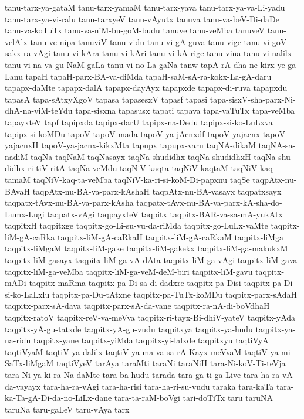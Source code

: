{tanu-tarx-ya-gataM
tanu-tarx-yamaM
tanu-tarx-yava
tanu-tarx-ya-va-Li-yadu
tanu-tarx-ya-vi-ralu
tanu-tarxyeV
tanu-vAyutx
tanuva
tanu-va-beV-Di-daDe
tanu-va-koTuTx
tanu-va-niM-bu-goM-budu
tanuve
tanu-veMba
tanuveV
tanu-velAlx
tanu-ve-nipa
tanuviV
tanu-vidu
tanu-vi-gA-guva
tanu-vige
tanu-vi-goV-sakx-ra-vAgi
tanu-vi-kAra
tanu-vi-kAri
tanu-vi-kA-rige
tanu-vina
tanu-vi-nalilx
tanu-vi-na-va-gu-NaM-gaLa
tanu-vi-no-La-gaNa
tanw
tapA-rA-dha-ne-kirx-ye-ga-Lanu
tapaH
tapaH-parx-BA-va-diMda
tapaH-saM-sA-ra-kokx-La-gA-daru
tapapx-daMte
tapapx-dalA
tapapx-dayAyx
tapapxde
tapapx-di-ruva
tapapxdu
tapasA
tapa-sAtxyXgoV
tapasa
tapasesxV
tapasf
tapasi
tapa-sisxV-sha-parx-Ni-dhA-na-viM-teYdu
tapa-sisxna
tapasusx
tapati
tapava
tapa-vaTuTx
tapa-veMba
tapayxteV
tapf
tapipxda
tapipx-darU
tapipx-na-Dedu
tapipx-si-ko-LuLxva
tapipx-si-koMDu
tapoV
tapoV-mada
tapoV-ya-jAcnxdf
tapoV-yajacnx
tapoV-yajacnxH
tapoV-ya-jacnx-kikxMta
tapupx
tapupx-varu
taqNA-dikaM
taqNA-sa-nadiM
taqNa
taqNaM
taqNasayx
taqNa-shudidhx
taqNa-shudidhxH
taqNa-shu-didhx-ri-tiV-ritA
taqNa-veMdu
taqNiV-kaqta
taqNiV-kaqtaM
taqNiV-kaq-tamaM
taqNiV-kaq-ta-veMba
taqNiV-ka-ri-si-koM-Di-papxnu
taqSe
taqpAtx-nu-BAvaH
taqpAtx-nu-BA-va-parx-kAshaH
taqpAtx-nu-BA-vasayx
taqpatxsayx
taqpatx-tAvx-nu-BA-va-parx-kAsha
taqpatx-tAvx-nu-BA-va-parx-kA-sha-do-Lumx-Lugi
taqpatx-vAgi
taqpayxteV
taqpitx
taqpitx-BAR-va-sa-mA-yukAtx
taqpitxH
taqpitxge
taqpitx-go-Li-su-vu-da-riMda
taqpitx-go-LuLx-vaMte
taqpitx-liM-gA-caRka
taqpitx-liM-gA-caRkaH
taqpitx-liM-gA-caRkaM
taqpitx-liMga
taqpitx-liMgaM
taqpitx-liM-gake
taqpitx-liM-gakekx
taqpitx-liM-ga-makukxM
taqpitx-liM-gasayx
taqpitx-liM-ga-vA-dAta
taqpitx-liM-ga-vAgi
taqpitx-liM-gava
taqpitx-liM-ga-veMba
taqpitx-liM-ga-veM-deM-biri
taqpitx-liM-gavu
taqpitx-mADi
taqpitx-maRma
taqpitx-pa-Di-sa-di-dadxre
taqpitx-pa-Disi
taqpitx-pa-Di-si-ko-LaLxlu
taqpitx-pa-Du-tAtxne
taqpitx-pa-TuTx-koMDu
taqpitx-parx-sAdaH
taqpitx-parx-sA-dava
taqpitx-parx-sA-da-vane
taqpitx-ra-nA-di-boVdhaH
taqpitx-ratoV
taqpitx-reV-va-meVva
taqpitx-ri-tayx-Bi-dhiV-yateV
taqpitx-yAda
taqpitx-yA-gu-tatxde
taqpitx-yA-gu-vudu
taqpitxya
taqpitx-ya-hudu
taqpitx-ya-na-ridu
taqpitx-yane
taqpitx-yiMda
taqpitx-yi-lalxde
taqpitxyu
taqtiVyA
taqtiVyaM
taqtiV-ya-dalilx
taqtiV-ya-ma-va-sa-rA-Kayx-meVvaM
taqtiV-ya-mi-SaTx-liMgaM
taqtiVyeV
tarAya
taraMti
taraNi
taraNiH
tara-Ni-koV-Ti-teVja
tara-Ni-ya-ki-ra-Na-daMte
tara-ba-hudu
tarada
tara-ga-ti-ga-Live
tara-ha-ra-vA-da-vayayx
tara-ha-ra-vAgi
tara-ha-risi
tara-ha-ri-su-vudu
taraka
tara-kaTa
tara-ka-Ta-gA-Di-da-no-LiLx-dane
tara-ta-raM-boVgi
tari-doTiTx
taru
taruNA
taruNa
taru-gaLeV
taru-vAya
tarx
}
